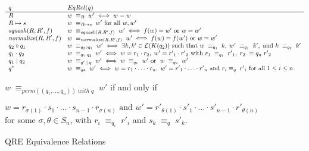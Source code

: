 \documentclass{svproc}
\newcommand{\squash}[3]{\ensuremath{\mathit{squash}(#1, #2, #3)}}
\newcommand{\perm}[2]{\ensuremath{\mathit{perm}(#1)\; \mathit{with}\; #2}}
\newcommand{\normalize}[3]{\ensuremath{\mathit{normalize}(#1, #2, #3)}}
\newcommand{\sep}{\ensuremath{\; | \;}}
\begin{document}
\begin{figure}[t]
  \begin{center}
\[
    \begin{array}{l@{\quad}l} 
      q & EqRel(q)  \\ \hline
      R & w \; \equiv_R \; w' \iff w = w \\
      R \mapsto s & w \; \equiv_{R \mapsto s} \; w' \text{ for all }w, w'\\
      \squash{R}{R'}{f} & w \; \equiv_{\squash{R}{R'}{f}} \; w' \iff f(w) = w'
      \text{ or } w = w' \\
      \normalize{R}{R'}{f} & w \; \equiv_{\normalize{R}{R'}{f}} \; w' \iff
      f(w)=f(w') \text{ or }w = w'\\
      q_2 \circ  q_1 &  w \; \equiv_{q_2 \circ q_1} \; w' \iff \exists k, k' \in
  \mathcal{L}(K(q_2)) \text{ such that } w \; \equiv_{q_1} \; k, \; w' \;
  \equiv_{q_1} \; k', \text{ and } k \; \equiv_{q_2} \; k'\\
      q_1 \cdot q_2 &  w \; \equiv_{q_1 \cdot q_2} \; w'  \iff w = r_1
      \cdot r_2, \; w' = {r'}_1 \cdot {r'}_2 \text{ with } r_1 \; \equiv_{q_1}
      \; {r'}_1, \; r_2 \; \equiv{q_n} \; {r'}_2\\
      q_1 \sep q_2 &  w \; \equiv_{q' \sep q} \; w' \iff w \; \equiv_{q_1} \; w'
      \text{ or } \; w \; \equiv_{q_2} \; w'\\
      q^* &  w \; \equiv_{q*} \; w' \iff w = r_1 \cdot \ldots \cdot r_n, \; w'
      = {r'}_1 \cdot \ldots \cdot {r'}_n \text{ and } r_i \equiv_{q} \; {r'}_i
      \text{ for all } 1 \leq i \leq n\\
    \end{array}
    \]
    \end{center}
    $w \; \equiv_{\perm{(q_1, \ldots, q_n)}{q}} \; w' $ if and only if
    
    $w = r_{\sigma(1)} \cdot s_1 \cdot \ldots \cdot s_{n-1} \cdot r_{\sigma(n)}
    \text{ and } w' = {r'}_{\theta(1)} \cdot s'_1 \cdot \ldots \cdot s'_{n-1}
    \cdot {r'}_{\theta(n)}$ for some $\sigma, \theta \in S_n$, with $r_i \;
    \equiv_{q_i} \; r'_i$ and $s_k \; \equiv_{q} \; s'_{k}$.
  \caption{QRE Equivalence Relations}
  \label{fig:relations}
\end{figure}
\end{document}

